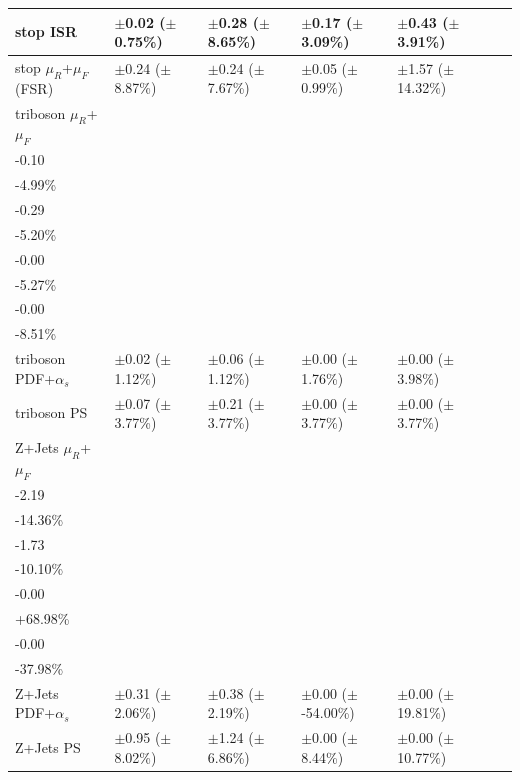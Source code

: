 \begin{table}[ht]
{\begin{tabular}{l l l l l l l }
\midrule
stop ISR & \(\pm\)0.02 (\(\pm\)0.75\%) &\(\pm\)0.28 (\(\pm\)8.65\%) &\(\pm\)0.17 (\(\pm\)3.09\%) &\(\pm\)0.43 (\(\pm\)3.91\%) \tabularnewline
\midrule
stop \(\mu_R\)+\(\mu_F\) (FSR) & \(\pm\)0.24 (\(\pm\)8.87\%) &\(\pm\)0.24 (\(\pm\)7.67\%) &\(\pm\)0.05 (\(\pm\)0.99\%) &\(\pm\)1.57 (\(\pm\)14.32\%) \tabularnewline
\midrule
triboson \(\mu_R\)+\(\mu_F\) & \(\substack{+0.11\\-0.10}\) \big(\(\substack{+5.86\%\\-4.99\%}\)\big) & \(\substack{+0.34\\-0.29}\) \big(\(\substack{+6.05\%\\-5.20\%}\)\big) & \(\substack{+0.00\\-0.00}\) \big(\(\substack{+6.16\%\\-5.27\%}\)\big) & \(\substack{+0.00\\-0.00}\) \big(\(\substack{+10.12\%\\-8.51\%}\)\big) \tabularnewline
\midrule
triboson PDF+\(\alpha_s\) & \(\pm\)0.02 (\(\pm\)1.12\%) &\(\pm\)0.06 (\(\pm\)1.12\%) &\(\pm\)0.00 (\(\pm\)1.76\%) &\(\pm\)0.00 (\(\pm\)3.98\%) \tabularnewline
\midrule
triboson PS & \(\pm\)0.07 (\(\pm\)3.77\%) &\(\pm\)0.21 (\(\pm\)3.77\%) &\(\pm\)0.00 (\(\pm\)3.77\%) &\(\pm\)0.00 (\(\pm\)3.77\%) \tabularnewline
\midrule
Z+Jets \(\mu_R\)+\(\mu_F\) & \(\substack{+3.34\\-2.19}\) \big(\(\substack{+21.89\%\\-14.36\%}\)\big) & \(\substack{+1.21\\-1.73}\) \big(\(\substack{+7.03\%\\-10.10\%}\)\big) & \(\substack{+0.00\\-0.00}\) \big(\(\substack{-278.89\%\\+68.98\%}\)\big) & \(\substack{+0.00\\-0.00}\) \big(\(\substack{+319.96\%\\-37.98\%}\)\big) \tabularnewline
\midrule
Z+Jets PDF+\(\alpha_s\) & \(\pm\)0.31 (\(\pm\)2.06\%) &\(\pm\)0.38 (\(\pm\)2.19\%) &\(\pm\)0.00 (\(\pm\)-54.00\%) &\(\pm\)0.00 (\(\pm\)19.81\%) \tabularnewline
\midrule
Z+Jets PS & \(\pm\)0.95 (\(\pm\)8.02\%) &\(\pm\)1.24 (\(\pm\)6.86\%) &\(\pm\)0.00 (\(\pm\)8.44\%) &\(\pm\)0.00 (\(\pm\)10.77\%) \tabularnewline
\bottomrule
\end{tabular}}
\end{table}


